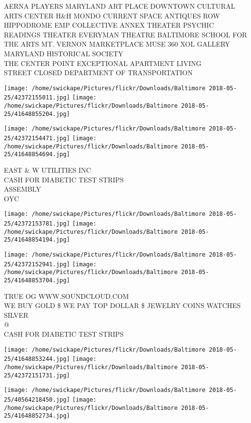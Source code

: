 \documentclass[10pt,letterpaper]{article}
\begin{document}
AERNA PLAYERS MARYLAND ART PLACE DOWNTOWN CULTURAL ARTS CENTER H\&H MONDO CURRENT SPACE ANTIQUES ROW\\
HIPPODROME EMP COLLECTIVE ANNEX THEATER PSYCHIC READINGS THEATER EVERYMAN THEATRE BALTIMORE SCHOOL FOR THE ARTS MT. VERNON MARKETPLACE MUSE 360 XOL GALLERY MARYLAND HISTORICAL SOCIETY\\
THE CENTER POINT EXCEPTIONAL APARTMENT LIVING\\
STREET CLOSED DEPARTMENT OF TRANSPORTATION
\pagebreak

\texttt{[image: /home/swickape/Pictures/flickr/Downloads/Baltimore 2018-05-25/42372155011.jpg]}
\texttt{[image: /home/swickape/Pictures/flickr/Downloads/Baltimore 2018-05-25/41648855204.jpg]}

\texttt{[image: /home/swickape/Pictures/flickr/Downloads/Baltimore 2018-05-25/42372154471.jpg]}
\texttt{[image: /home/swickape/Pictures/flickr/Downloads/Baltimore 2018-05-25/41648854694.jpg]}

EAST  \& W UTILITIES INC\\
CASH FOR DIABETIC TEST STRIPS\\
ASSEMBLY\\
OYC
\pagebreak

\texttt{[image: /home/swickape/Pictures/flickr/Downloads/Baltimore 2018-05-25/42372153781.jpg]}
\texttt{[image: /home/swickape/Pictures/flickr/Downloads/Baltimore 2018-05-25/41648854194.jpg]}

\texttt{[image: /home/swickape/Pictures/flickr/Downloads/Baltimore 2018-05-25/42372152941.jpg]}
\texttt{[image: /home/swickape/Pictures/flickr/Downloads/Baltimore 2018-05-25/41648853704.jpg]}

TRUE OG WWW.SOUNDCLOUD.COM\\
WE BUY GOLD \$ WE PAY TOP DOLLAR \$ JEWELRY COINS WATCHES SILVER\\
@\\
CASH FOR DIABETIC TEST STRIPS
\pagebreak

\texttt{[image: /home/swickape/Pictures/flickr/Downloads/Baltimore 2018-05-25/41648853244.jpg]}
\texttt{[image: /home/swickape/Pictures/flickr/Downloads/Baltimore 2018-05-25/42372151731.jpg]}

\texttt{[image: /home/swickape/Pictures/flickr/Downloads/Baltimore 2018-05-25/40564218450.jpg]}
\texttt{[image: /home/swickape/Pictures/flickr/Downloads/Baltimore 2018-05-25/41648852734.jpg]}
\end{document}
